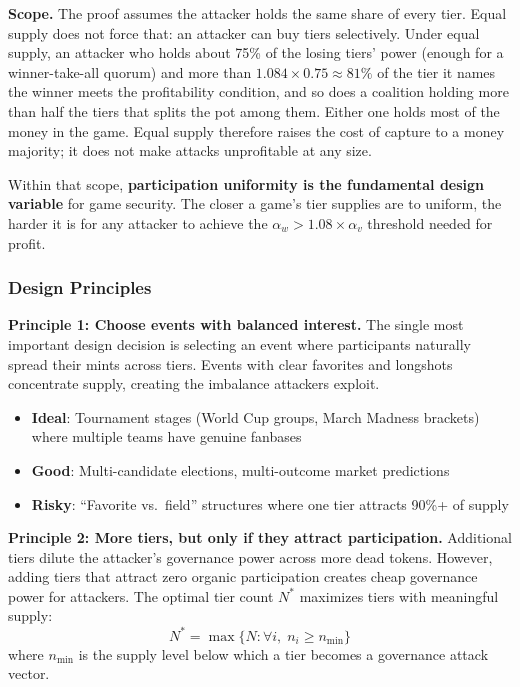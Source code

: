 \documentclass[11pt,a4paper]{article}
\begin{document}
\textbf{Scope.} The proof assumes the attacker holds the same share of every tier. Equal supply does not force that: an attacker can buy tiers selectively. Under equal supply, an attacker who holds about 75\% of the losing tiers' power (enough for a winner-take-all quorum) and more than $1.084 \times 0.75 \approx 81\%$ of the tier it names the winner meets the profitability condition, and so does a coalition holding more than half the tiers that splits the pot among them. Either one holds most of the money in the game. Equal supply therefore raises the cost of capture to a money majority; it does not make attacks unprofitable at any size.

Within that scope, \textbf{participation uniformity is the fundamental design variable} for game security. The closer a game's tier supplies are to uniform, the harder it is for any attacker to achieve the $\alpha_w > 1.08 \times \alpha_v$ threshold needed for profit.

\subsubsection{Design Principles}

\textbf{Principle 1: Choose events with balanced interest.} The single most important design decision is selecting an event where participants naturally spread their mints across tiers. Events with clear favorites and longshots concentrate supply, creating the imbalance attackers exploit.

\begin{itemize}[nosep]
\item \textbf{Ideal}: Tournament stages (World Cup groups, March Madness brackets) where multiple teams have genuine fanbases
\item \textbf{Good}: Multi-candidate elections, multi-outcome market predictions
\item \textbf{Risky}: ``Favorite vs.\ field'' structures where one tier attracts 90\%+ of supply
\end{itemize}

\textbf{Principle 2: More tiers, but only if they attract participation.} Additional tiers dilute the attacker's governance power across more dead tokens. However, adding tiers that attract zero organic participation creates cheap governance power for attackers. The optimal tier count $N^*$ maximizes tiers with meaningful supply:
\[
N^* = \max \{ N : \forall i, \; n_i \geq n_{\min} \}
\]
where $n_{\min}$ is the supply level below which a tier becomes a governance attack vector.
\end{document}
